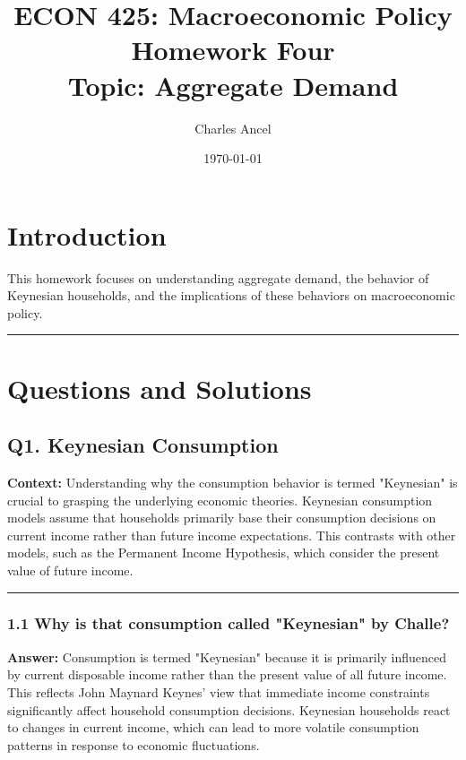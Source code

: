 \documentclass{article}
\begin{document}
\title{ECON 425: Macroeconomic Policy\large \\Homework Four\\Topic: Aggregate Demand}
\author{Charles Ancel}
\date{\today}
\maketitle

\section{Introduction}

This homework focuses on understanding aggregate demand, the behavior of Keynesian households, and the implications of these behaviors on macroeconomic policy.

\noindent\rule{\linewidth}{1pt}

\section{Questions and Solutions}

\subsection*{Q1. Keynesian Consumption}

\textbf{Context:} Understanding why the consumption behavior is termed "Keynesian" is crucial to grasping the underlying economic theories. Keynesian consumption models assume that households primarily base their consumption decisions on current income rather than future income expectations. This contrasts with other models, such as the Permanent Income Hypothesis, which consider the present value of future income.

\noindent\rule{\linewidth}{0.5pt}

\subsubsection*{1.1 Why is that consumption called "Keynesian" by Challe?}

\textbf{Answer:} 
Consumption is termed "Keynesian" because it is primarily influenced by current disposable income rather than the present value of all future income. This reflects John Maynard Keynes' view that immediate income constraints significantly affect household consumption decisions. Keynesian households react to changes in current income, which can lead to more volatile consumption patterns in response to economic fluctuations.
\end{document}
